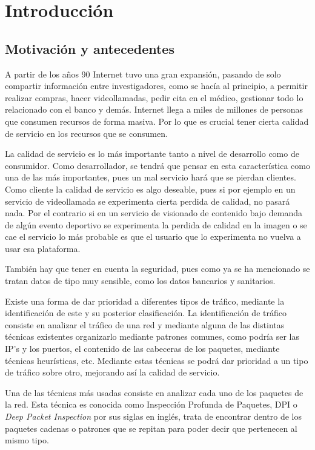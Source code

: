 \chapter{Introducción}

\section{Motivación y antecedentes}

A partir de los años 90 Internet tuvo una gran expansión, pasando de solo compartir información entre investigadores, 
como se hacía al principio, a permitir realizar compras, hacer videollamadas, pedir cita en el médico, gestionar 
todo lo relacionado con el banco y demás. Internet 
llega a miles de millones de personas que consumen recursos de forma masiva. Por lo que es crucial tener cierta 
calidad de servicio en los recursos que se consumen.

\intro La calidad de servicio es lo más importante tanto a nivel de desarrollo como de consumidor. Como desarrollador, 
se tendrá que pensar en esta característica como una de las más importantes, pues un mal servicio hará que se pierdan 
clientes. Como cliente la calidad de servicio es algo deseable, pues si por ejemplo en un servicio de videollamada se 
experimenta cierta perdida de calidad, no pasará nada. Por el contrario si en un servicio de visionado de contenido 
bajo demanda de algún evento deportivo se experimenta la perdida de calidad en la imagen o se cae el servicio lo más 
probable es que el usuario que lo experimenta no vuelva a usar esa plataforma. \cite{redes2010a}

\intro También hay que tener en cuenta la seguridad, pues como ya se ha mencionado se tratan datos de tipo muy sensible, 
como los datos bancarios y sanitarios.

\intro Existe una forma de dar prioridad a diferentes tipos de tráfico, mediante la identificación de este y su posterior 
clasificación. La identificación de tráfico consiste en analizar el tráfico de una red y mediante alguna de las distintas 
técnicas existentes organizarlo mediante patrones comunes, como podría ser las IP's y los puertos, el contenido de las 
cabeceras de los paquetes, mediante técnicas heurísticas, etc. Mediante estas técnicas se podrá dar prioridad a un tipo 
de tráfico sobre otro, mejorando así la calidad de servicio.

\intro Una de las técnicas más usadas consiste en analizar cada uno de los paquetes de la red. Esta técnica es conocida como 
Inspección Profunda de Paquetes, DPI o \textit{Deep Packet Inspection} \cite{dpiaproximacion} por sus siglas en inglés, 
trata de encontrar dentro de los paquetes cadenas o patrones que se repitan para poder decir que pertenecen al mismo tipo. 

